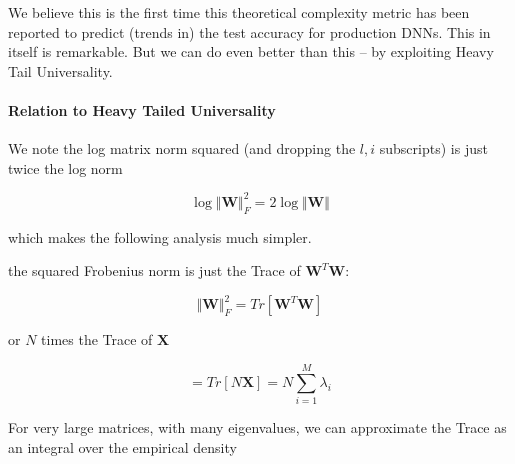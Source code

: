 We believe this is the first time this theoretical complexity metric has been reported to predict (trends in) the test accuracy for production
DNNs.  This in itself is remarkable.  But we can do even better than this -- by exploiting Heavy Tail Universality.

\paragraph{Relation to Heavy Tailed Universality}

We note the log matrix norm squared (and dropping the $l,i$ subscripts) is just twice the log norm

$$\log\Vert\mathbf{W}\Vert_{F}^{2}=2\log\Vert\mathbf{W}\Vert$$

which makes the following analysis much simpler.

the squared Frobenius norm is just the Trace of $\mathbf{W}^{T}\mathbf{W}$:

$$\Vert\mathbf{W}\Vert_{F}^{2}=Tr[\mathbf{W}^{T}\mathbf{W}]$$

or $N$ times the Trace of $\mathbf{X}$

$$=Tr[N\mathbf{X}]=N\sum_{i=1}^{M}\lambda_{i}$$

For very large matrices, with many eigenvalues, we can approximate the Trace as an integral over the empirical density

 


